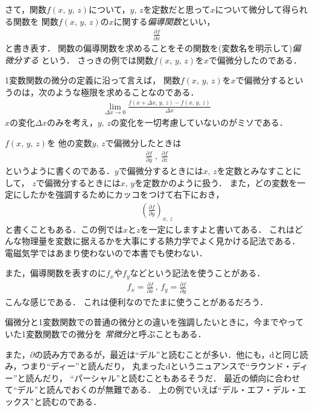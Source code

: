 さて，関数$f(x, \, y, \, z)$について，$y, \, z$を定数だと思って$x$について微分して得られる関数を
関数$f(x, \, y, \, z)$の$x$に関する\emph{偏導関数}といい，
\begin{align}
\frac{ \partial f}{\partial x}
\label{eq:xhenbibun}
\end{align}
と書き表す．
関数の偏導関数を求めることをその関数を(変数名を明示して)\emph{偏微分する}
という．
さっきの例では関数$f(x, \, y, \, z)$を$x$で偏微分したのである．

1変数関数の微分の定義に沿って言えば，
関数$f(x, \, y, \, z)$を$x$で偏微分するというのは，次のような極限を求めることなのである．
\begin{align}
\lim_{\varDelta x \to 0} \frac{ f(x + \varDelta x , \, y, \, z) - f(x, \, y, \, z)}{\varDelta x }
\end{align}
$x$の変化$\varDelta x$のみを考え，$y, \, z$の変化を一切考慮していないのがミソである．

$f(x, \, y, \, z)$を
他の変数$y, \, z$で偏微分したときは
\begin{align*}
\frac{\partial f}{\partial y} \; , \; \frac{\partial f}{\partial z}
\end{align*}
というように書くのである．$y$で偏微分するときには$x, \, z$を定数とみなすことにして，
$z$で偏微分するときには$x, \, y$を定数かのように扱う．
また，どの変数を一定にしたかを強調するためにカッコをつけて右下におき，
\begin{align*}
\left( \frac{\partial f}{\partial y} \right)_{x, \, z}
\end{align*}
と書くこともある．この例では$x$と$z$を一定にしますよと書いてある．
これはどんな物理量を変数に据えるかを大事にする熱力学でよく見かける記法である．
電磁気学ではあまり使わないので本書でも使わない．

また，偏導関数を表すのに$f_x$や$f_y$などという記法を使うことがある．
\begin{align}
f_ x = \frac{\partial f}{\partial x} \, , \, f_ y = \frac{\partial f}{\partial y}
\label{eq:hendoukansusoeji}
\end{align}
こんな感じである．
これは便利なのでたまに使うことがあるだろう．

偏微分と1変数関数での普通の微分との違いを強調したいときに，今までやっていた1変数関数での微分を
\emph{常微分}と呼ぶこともある．

また，$\partial$の読み方であるが，最近は``デル''と読むことが多い．他にも，dと同じ読み，つまり``ディー''と読んだり，
丸まったdというニュアンスで``ラウンド・ディー''と読んだり，
``パーシャル''と読むこともあるそうだ．
最近の傾向に合わせて``デル''と読んでおくのが無難である．
上の例でいえば``デル・エフ・デル・エックス''と読むのである．

